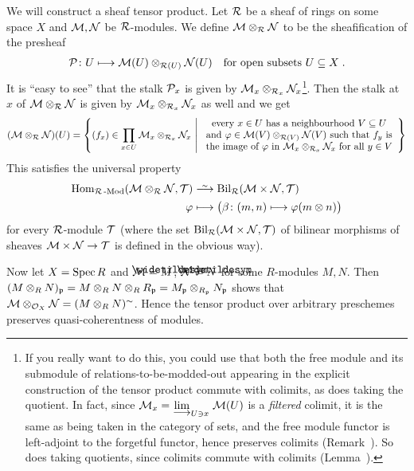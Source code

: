 \documentclass[a4paper,parskip=half,numbers=enddot, DIV=12]{scrreprt}
\begin{document}
\begin{rem}
	We will construct a sheaf tensor product. Let $\mathcal{R}$ be a sheaf of rings on some space $X$ and $\mathcal{M},\mathcal{N}$ be $\mathcal{R}$-modules. We define $\mathcal{M}\otimes_{\mathcal{R}}\mathcal{N}$ to be the sheafification of the presheaf 
	\begin{align*}
		\mathcal{P}\colon U\longmapsto \mathcal{M}(U)\otimes_{\mathcal{R}(U)}\mathcal{N}(U)\quad\text{for open subsets }U\subseteq X\;.
	\end{align*}
	It is ``easy to see'' that the stalk $\mathcal{P}_x$ is given by $\mathcal{M}_x\otimes_{\mathcal{R}_x}\mathcal{N}_x$\footnote{If you really want to do this, you could use that both the free module and its submodule of relations-to-be-modded-out appearing in the explicit construction of the tensor product commute with colimits, as does taking the quotient. In fact, since $\Mm_x=\colimit[U\ni x] \Mm(U)$ is a \emph{filtered} colimit, it is the same as being taken in the category of sets, and the free module functor is left-adjoint to the forgetful functor, hence preserves colimits (Remark~). So does taking quotients, since colimits commute with colimits (Lemma~).}. Then the stalk at $x$ of $\mathcal{M}\otimes_{\mathcal{R}}\mathcal{N}$ is given by $\mathcal{M}_x\otimes_{\mathcal{R}_x}\mathcal{N}_x$ as well and we get
	\begin{align*}
		(\mathcal{M}\otimes_{\mathcal{R}}\mathcal{N})(U)=\left\{(f_x)\in\prod_{x\in U}\mathcal{M}_x\otimes_{\mathcal{R}_x}\mathcal{N}_x\ \middle|\ \begin{array}{c}
			\text{every }x\in U\text{ has a neighbourhood }V\subseteq U\\
			\text{and }\varphi\in \mathcal{M}(V)\otimes_{\mathcal{R}(V)}\mathcal{N}(V)\text{ such that }f_y\text{ is}\\
			\text{the image of }\varphi\text{ in }\mathcal{M}_x\otimes_{\mathcal{R}_x}\mathcal{N}_x\text{ for all }y\in V
		\end{array}\right\}
	\end{align*}
	This satisfies the universal property 
	\begin{align*}
		\Hom_{\Rr\cat{-Mod}}(\Mm\otimes_\Rr\Nn,\Tt)&\isomorphism \operatorname{Bil}_\Rr(\Mm\times \Nn,\Tt)\\
		\phi&\longmapsto\big(\beta\colon (m,n)\longmapsto \phi(m\otimes n)\big)
	\end{align*}
	for every $\mathcal{R}$-module $\mathcal{T}$ (where the set $\operatorname{Bil}_{\mathcal{R}}(\mathcal{M}\times \mathcal{N},\mathcal{T})$ of bilinear morphisms of sheaves $\Mm\times \Nn\morphism \Tt$ is defined in the obvious way).
	
	Now let $X=\operatorname{Spec} R$ and $\Mm=\snake{M}$, $\Nn=\snake{N}$ for some $R$-modules $M,N$. Then $(M\otimes_RN)_{\mathfrak{p}}=M\otimes_RN\otimes_RR_{\mathfrak{p}}=M_{\mathfrak{p}}\otimes_{R_{\mathfrak{p}}}N_{\mathfrak{p}}$ shows that $\mathcal{M}\otimes _{\mathcal{O}_X}\mathcal{N}=(M\otimes_RN)^\sim$. Hence the tensor product over arbitrary preschemes preserves quasi-coherentness of modules.
	

\end{rem}
\end{document}
